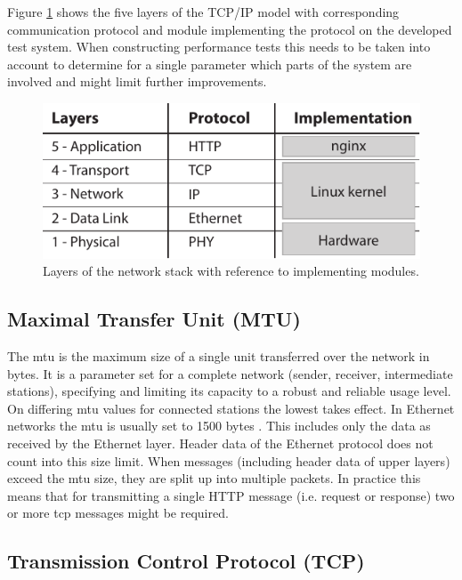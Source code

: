 Figure \ref{fig:net-layers} shows the five layers of the TCP/IP model with corresponding communication protocol and module implementing the protocol on the developed test system. When constructing performance tests this needs to be taken into account to determine for a single parameter which parts of the system are involved and might limit further improvements.

\begin{figure}[H]
	\centering
	\includegraphics[scale=1]{images/network-layers.pdf}
	\caption{Layers of the network stack with reference to implementing modules.}
	\label{fig:net-layers}
\end{figure}

\subsection{Maximal Transfer Unit (MTU)}
\label{subsec:mtu}

The \gls{mtu} is the maximum size of a single unit transferred over the network in bytes. It is a parameter set for a complete network (sender, receiver, intermediate stations), specifying and limiting its capacity to a robust and reliable usage level. On differing \gls{mtu} values for connected stations the lowest takes effect. In Ethernet networks the \gls{mtu} is usually set to 1500 bytes \cite{kn1}. This includes only the data as received by the Ethernet layer. Header data of  the Ethernet protocol does not count into this size limit. When messages (including header data of upper layers) exceed the \gls{mtu} size, they are split up into multiple packets. In practice this means that for transmitting a single HTTP message (i.e. request or response) two or more \gls{tcp} messages might be required.

\subsection{Transmission Control Protocol (TCP)}

